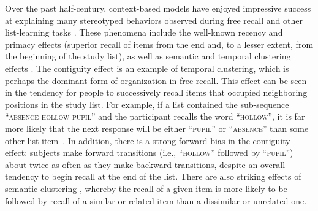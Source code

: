 Over the past half-century, context-based models have enjoyed impressive success at explaining many stereotyped behaviors observed during free recall and other list-learning tasks \citep[e.g.][]{Este55a, RaaiShif80, GlenEtal83, HowaKaha02a, SiroEtal05, KimbEtal07, PolyKaha08, PolyEtalTulv, SedeEtal08, PolyEtal09, ShanHowa12}.  These phenomena include the well-known recency and primacy effects (superior recall of items from the end and, to a lesser extent, from the beginning of the study list), as well as semantic and temporal clustering effects \citep[for review see][]{KahaEtal08}.  The contiguity effect is an example of temporal clustering, which is perhaps the dominant form of organization in free recall.  This effect can be seen in the tendency for people to successively recall items that occupied neighboring positions in the study list.  For example, if a list contained the sub-sequence \textsc{``absence hollow pupil''} and the participant recalls the word \textsc{``hollow''}, it is far more likely that the next response will be either \textsc{``pupil''} or \textsc{``absence''} than some other list item~\citep{Kaha96}.  In addition, there is a strong forward bias in the contiguity effect: subjects make forward transitions (i.e., \textsc{``hollow''} followed by \textsc{``pupil''}) about twice as often as they make backward transitions, despite an overall tendency to begin recall at the end of the list.  There are also striking effects of semantic clustering \citep{RomnEtal93, Bous53, BousEtal54, JenkRuss52, MannKaha12}, whereby the recall of a given item is more likely to be followed by recall of a similar or related item than a dissimilar or unrelated one.

